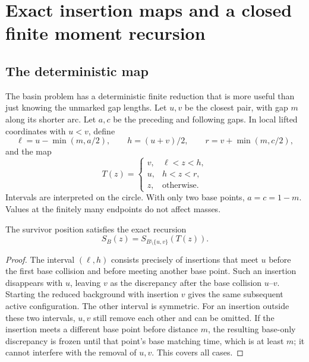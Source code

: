 \documentclass[11pt,letterpaper]{article}
\begin{document}
\section{Exact insertion maps and a closed finite moment recursion}\label{sec:maps}

\subsection{The deterministic map}

The basin problem has a deterministic finite reduction that is more useful
than just knowing the unmarked gap lengths. Let $u,v$ be the closest pair,
with gap $m$ along its shorter arc. Let $a,c$ be the preceding and following
gaps. In local lifted coordinates with $u<v$, define
\[
 \ell=u-\min(m,a/2),\qquad h=(u+v)/2,\qquad
 r=v+\min(m,c/2),
\]
and the map
\begin{equation}\label{eq:T}
 T(z)=\begin{cases}
 v,&\ell<z<h,\\
 u,&h<z<r,\\
 z,&\text{otherwise}.
 \end{cases}
\end{equation}
Intervals are interpreted on the circle. With only two base points,
$a=c=1-m$. Values at the finitely many endpoints do not affect masses.

\begin{proposition}\label{prop:map}
The survivor position satisfies the exact recursion
\begin{equation}\label{eq:map-recursion}
 S_B(z)=S_{B\setminus\{u,v\}}(T(z)).
\end{equation}
\end{proposition}
\begin{proof}
The interval $(\ell,h)$ consists precisely of insertions that meet $u$
before the first base collision and before meeting another base point.
Such an insertion disappears with $u$, leaving $v$ as the discrepancy after
the base collision $u$--$v$. Starting the reduced background with insertion
$v$ gives the same subsequent active configuration. The other interval is
symmetric. For an insertion outside these two intervals, $u,v$ still remove
each other and can be omitted. If the insertion meets a different base
point before distance $m$, the resulting base-only discrepancy is frozen
until that point's base matching time, which is at least $m$; it cannot
interfere with the removal of $u,v$. This covers all cases.
\end{proof}
\end{document}
